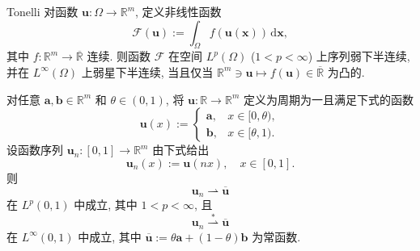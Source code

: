 \begin{Theorem}{Tonelli}
\label{thm:tonelli-convexity-weak-lower-semicontinuity}
对函数 $\bm{u}:\Omega\to\mathbb{R}^m$, 定义非线性函数
\begin{equation}\label{eq:tonelli-integral-functional-definition}
\mathcal{F}(\bm{u}):=\int_\Omega f(\bm{u}(\bm{x}))\,\mathrm{d}\bm{x},
\end{equation}
其中 $f:\mathbb{R}^m\to\overline{\mathbb{R}}$ 连续. 则函数 $\mathcal{F}$ 在空间 $L^p(\Omega)$ ($1<p<\infty$) 上序列弱下半连续, 并在 $L^\infty(\Omega)$ 上弱星下半连续, 当且仅当 $\mathbb{R}^m\ni\bm{u}\mapsto f(\bm{u})\in\overline{\mathbb{R}}$ 为凸的.
\end{Theorem}

\begingroup
\renewcommand{\endProof}{\par}
\endgroup

\begin{Lemma}
\label{lem:oscillating-sequence-average}
对任意 $\bm{a},\bm{b}\in\mathbb{R}^m$ 和 $\theta\in(0,1)$, 将 $\bm{u}:\mathbb{R}\to\mathbb{R}^m$ 定义为周期为一且满足下式的函数
\begin{equation}\label{eq:oscillating-two-value-periodic-function}
\bm{u}(x):=\begin{cases}\bm{a},&x\in[0,\theta),\\\bm{b},&x\in[\theta,1).\end{cases}
\end{equation}
设函数序列 $\bm{u}_n:[0,1]\to\mathbb{R}^m$ 由下式给出
\begin{equation}\label{eq:oscillating-rescaled-periodic-sequence}
\bm{u}_n(x):=\bm{u}(nx),\quad x\in[0,1].
\end{equation}
则
\begin{equation}\label{eq:oscillating-sequence-weak-lp-limit}
\bm{u}_n\rightharpoonup\overline{\bm{u}}
\end{equation}
在 $L^p(0,1)$ 中成立, 其中 $1<p<\infty$, 且
\begin{equation}\label{eq:oscillating-sequence-weak-star-linfty-limit}
\bm{u}_n\overset{*}{\rightharpoonup}\overline{\bm{u}}
\end{equation}
在 $L^\infty(0,1)$ 中成立, 其中 $\overline{\bm{u}}:=\theta\bm{a}+(1-\theta)\bm{b}$ 为常函数.
\end{Lemma}

